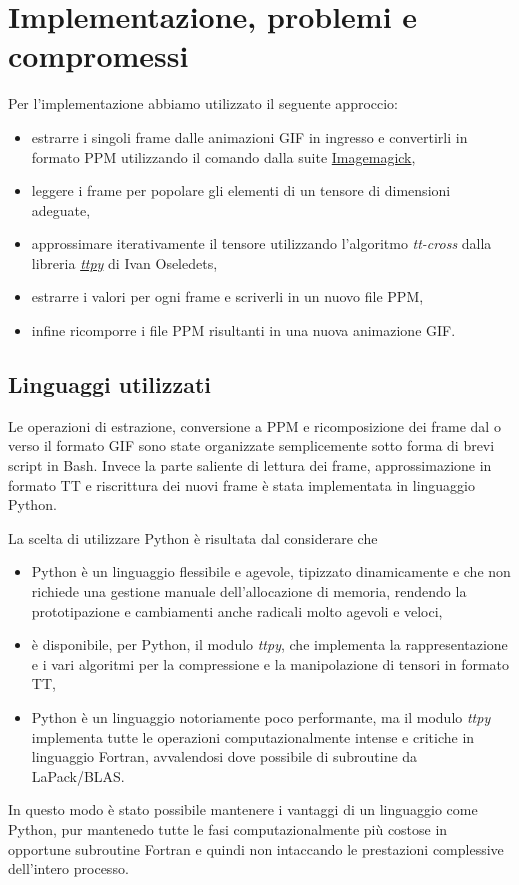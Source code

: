 \documentclass[11pt,a4paper]{article}
\begin{document}
\section{Implementazione, problemi e compromessi}
Per l'implementazione abbiamo utilizzato il seguente approccio:
\begin{itemize}
\item estrarre i singoli frame dalle animazioni GIF in ingresso e convertirli in formato PPM utilizzando il comando  dalla suite \href{http://www.imagemagick.org/}{Imagemagick},
\item leggere i frame per popolare gli elementi di un tensore di dimensioni adeguate,
\item approssimare iterativamente il tensore utilizzando l'algoritmo \emph{tt-cross} dalla libreria \href{https://github.com/oseledets/ttpy}{\emph{ttpy}} di Ivan Oseledets,
\item estrarre i valori per ogni frame e scriverli in un nuovo file PPM,
\item infine ricomporre i file PPM risultanti in una nuova animazione GIF.
\end{itemize}

\subsection{Linguaggi utilizzati}
Le operazioni di estrazione, conversione a PPM e ricomposizione dei frame dal o verso il formato GIF sono state organizzate semplicemente sotto forma di brevi script in Bash. Invece la parte saliente di lettura dei frame, approssimazione in formato TT e riscrittura dei nuovi frame è stata implementata in linguaggio Python.

La scelta di utilizzare Python è risultata dal considerare che
\begin{itemize}
\item Python è un linguaggio flessibile e agevole, tipizzato dinamicamente e che non richiede una gestione manuale dell'allocazione di memoria, rendendo la prototipazione e cambiamenti anche radicali molto agevoli e veloci,
\item è disponibile, per Python, il modulo \emph{ttpy}, che implementa la rappresentazione e i vari algoritmi per la compressione e la manipolazione di tensori in formato TT,
\item Python è un linguaggio notoriamente poco performante, ma il modulo \emph{ttpy} implementa tutte le operazioni computazionalmente intense e critiche in linguaggio Fortran, avvalendosi dove possibile di subroutine da LaPack/BLAS.
\end{itemize}
In questo modo è stato possibile mantenere i vantaggi di un linguaggio come Python, pur mantenedo tutte le fasi computazionalmente più costose in opportune subroutine Fortran e quindi non intaccando le prestazioni complessive dell'intero processo.
\end{document}
